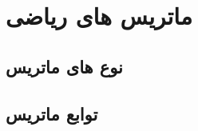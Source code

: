 \section{\textbf{ماتریس های ریاضی }}
\label{sec:2.8}
{
    \Large
    \begin{spacing}{1.5}
    \end{spacing}
}

\subsection{\textbf{نوع های ماتریس}}
{
    \Large
    \begin{spacing}{1.5}
        \textbf{\vspace{6pt}}
        \lr{}
        \textbf{\vspace{6pt}}
    \end{spacing}
}

\subsection{\textbf{توابع ماتریس}}
{
    \Large
    \begin{spacing}{1.5}
        \textbf{\vspace{6pt}}
        \lr{}
        \textbf{\vspace{6pt}}
    \end{spacing}
}

